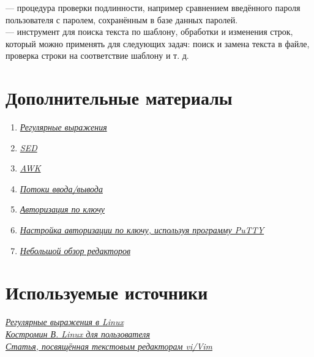 \documentclass[14pt, a4paper]{article}
\begin{document}
\noindent \href{https://ru.wikipedia.org/wiki/Аутентификация}{} — процедура проверки подлинности, например сравнением введённого пароля
пользователя с паролем, сохранённым в базе данных паролей.\\

\noindent \href{https://losst.pro/regulyarnye-vyrazheniya-linux}{} — инструмент для поиска текста по шаблону, обработки и изменения строк,
который можно применять для следующих задач: поиск и замена текста в файле, проверка строки на
соответствие шаблону и т. д.

\section*{Дополнительные материалы} 

\begin{enumerate}
    \item \href{https://habr.com/ru/post/115825/}{\textit{Регулярные выражения}}
    \item \href{http://rus-linux.net/MyLDP/consol/sed.html}{\textit{SED}}
    \item \href{http://rus-linux.net/MyLDP/consol/awk.html}{\textit{AWK}}
    \item \href{http://xgu.ru/wiki/Стандартные_потоки_ввода/вывода}{\textit{Потоки ввода/вывода}}
    \item \href{https://losst.pro/avtorizatsiya-po-klyuchu-ssh}{\textit{Авторизация по ключу}}
    \item \href{https://rtfm.co.ua/putty-nastrojka-avtorizacii-ssh-po-klyuchu/}{\textit{Настройка авторизации по ключу, используя программу PuTTY}}
    \item \href{https://losst.pro/luchshie-tekstovye-redaktory-linux}{\textit{Небольшой обзор редакторов}}
\end{enumerate}

\section*{Используемые источники} 

\href{https://losst.pro/regulyarnye-vyrazheniya-linux}{\textit{Регулярные выражения в Linux}}\\

\noindent \href{https://www.linuxcenter.ru/lib/books/kostromin}{\textit{Костромин В. Linux для пользователя}}\\

\noindent \href{https://help.ubuntu.ru/wiki/vim}{\textit{Статья, посвящённая текстовым редакторам vi/Vim}}\\
\end{document}
